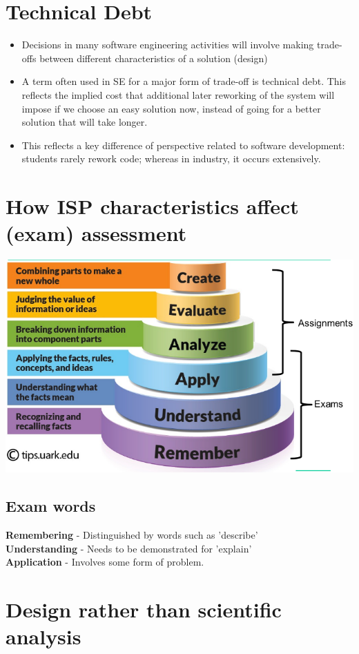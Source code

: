 \documentclass{article}[18pt]
\begin{document}
\section{Technical Debt}
\begin{itemize}
	\item Decisions in many software engineering activities will involve making trade-offs between different characteristics of a solution (design)
	\item A term often used in SE for a major form of trade-off is technical debt. This reflects the implied cost that additional later reworking of the system will impose if we choose an easy solution now, instead of going for a better solution that will take longer.
	\item This reflects a key difference of perspective related to software development: students rarely rework code; whereas in industry, it occurs extensively.
\end{itemize}
\section{How ISP characteristics affect (exam) assessment}
\begin{center}
	\includegraphics[scale=0.7]{Bloom}
\end{center}
\subsection{Exam words}
\textbf{Remembering} - Distinguished by words such as 'describe'\\
\textbf{Understanding} - Needs to be demonstrated for 'explain'\\
\textbf{Application} - Involves some form of problem.
\section{Design rather than scientific analysis}
\end{document}
